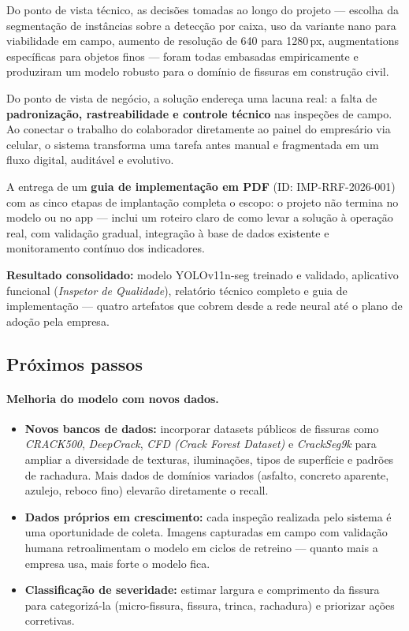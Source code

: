 \documentclass[11pt,a4paper]{article}
\begin{document}
Do ponto de vista técnico, as decisões tomadas ao longo do projeto — escolha da segmentação de
instâncias sobre a detecção por caixa, uso da variante nano para viabilidade em campo, aumento
de resolução de 640 para 1280\,px, augmentations específicas para objetos finos — foram todas
embasadas empiricamente e produziram um modelo robusto para o domínio de fissuras em
construção civil.

Do ponto de vista de negócio, a solução endereça uma lacuna real: a falta de \textbf{padronização,
rastreabilidade e controle técnico} nas inspeções de campo. Ao conectar o trabalho do colaborador
diretamente ao painel do empresário via celular, o sistema transforma uma tarefa antes manual
e fragmentada em um fluxo digital, auditável e evolutivo.

A entrega de um \textbf{guia de implementação em PDF} (ID: IMP-RRF-2026-001) com as cinco
etapas de implantação completa o escopo: o projeto não termina no modelo ou no app — inclui
um roteiro claro de como levar a solução à operação real, com validação gradual, integração
à base de dados existente e monitoramento contínuo dos indicadores.

\begin{infobox}
\textbf{Resultado consolidado:} modelo YOLOv11n-seg treinado e validado, aplicativo funcional
(\emph{Inspetor de Qualidade}), relatório técnico completo e guia de implementação —
quatro artefatos que cobrem desde a rede neural até o plano de adoção pela empresa.
\end{infobox}

\subsection{Próximos passos}

\paragraph{Melhoria do modelo com novos dados.}
\begin{itemize}[leftmargin=1.4em]
  \item \textbf{Novos bancos de dados:} incorporar datasets públicos de fissuras como
        \emph{CRACK500}, \emph{DeepCrack}, \emph{CFD (Crack Forest Dataset)} e
        \emph{CrackSeg9k} para ampliar a diversidade de texturas, iluminações, tipos de
        superfície e padrões de rachadura. Mais dados de domínios variados (asfalto,
        concreto aparente, azulejo, reboco fino) elevarão diretamente o recall.
  \item \textbf{Dados próprios em crescimento:} cada inspeção realizada pelo sistema é uma
        oportunidade de coleta. Imagens capturadas em campo com validação humana retroalimentam
        o modelo em ciclos de retreino — quanto mais a empresa usa, mais forte o modelo fica.
  \item \textbf{Classificação de severidade:} estimar largura e comprimento da fissura para
        categorizá-la (micro-fissura, fissura, trinca, rachadura) e priorizar ações corretivas.
\end{itemize}
\end{document}
